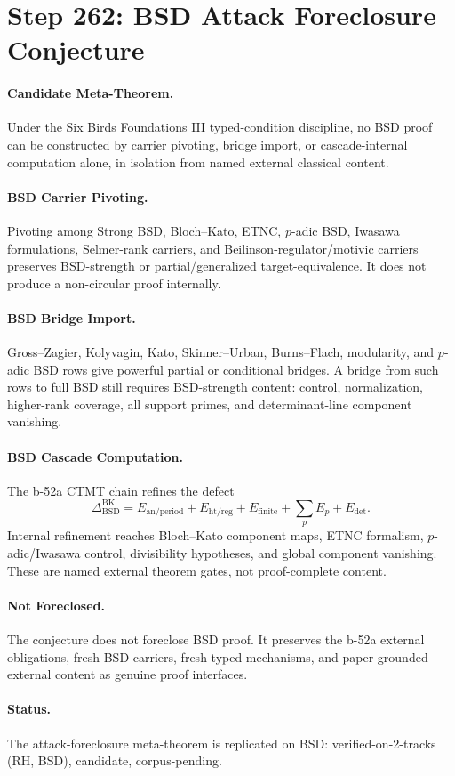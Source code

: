 \section*{Step 262: BSD Attack Foreclosure Conjecture}

\paragraph{Candidate Meta-Theorem.}
Under the Six Birds Foundations III typed-condition discipline, no BSD proof can
be constructed by carrier pivoting, bridge import, or cascade-internal
computation alone, in isolation from named external classical content.

\paragraph{BSD Carrier Pivoting.}
Pivoting among Strong BSD, Bloch--Kato, ETNC, $p$-adic BSD, Iwasawa
formulations, Selmer-rank carriers, and Beilinson-regulator/motivic carriers
preserves BSD-strength or partial/generalized target-equivalence.  It does not
produce a non-circular proof internally.

\paragraph{BSD Bridge Import.}
Gross--Zagier, Kolyvagin, Kato, Skinner--Urban, Burns--Flach, modularity, and
$p$-adic BSD rows give powerful partial or conditional bridges.  A bridge from
such rows to full BSD still requires BSD-strength content: control,
normalization, higher-rank coverage, all support primes, and determinant-line
component vanishing.

\paragraph{BSD Cascade Computation.}
The b-52a CTMT chain refines the defect
\[
\Delta_{\mathrm{BSD}}^{\mathrm{BK}}
 = E_{\mathrm{an/period}}+E_{\mathrm{ht/reg}}+E_{\mathrm{finite}}
   +\sum_p E_p+E_{\mathrm{det}}.
\]
Internal refinement reaches Bloch--Kato component maps, ETNC formalism,
$p$-adic/Iwasawa control, divisibility hypotheses, and global component
vanishing.  These are named external theorem gates, not proof-complete content.

\paragraph{Not Foreclosed.}
The conjecture does not foreclose BSD proof.  It preserves the b-52a external
obligations, fresh BSD carriers, fresh typed mechanisms, and paper-grounded
external content as genuine proof interfaces.

\paragraph{Status.}
The attack-foreclosure meta-theorem is replicated on BSD: verified-on-2-tracks
(RH, BSD), candidate, corpus-pending.
